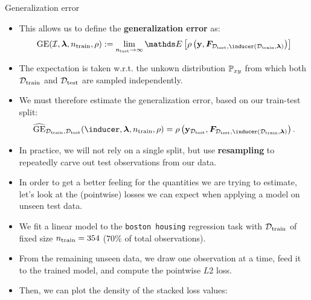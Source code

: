 \begin{vbframe}{Generalization error}

\begin{itemize}
  \item This allows us to define the \textbf{generalization error} as:
  $$\GEfull := 
  \lim_{\ntest \rightarrow \infty} \E \left[ \rho \left(
  \yv, \F_{\Dtest, \inducer(\D_{\mathrm{train}}, \lamv)} 
  \right)\right]$$
  \item The expectation is taken w.r.t. the unkown distribution $\mathbb{P}_{xy}$ from 
  which both $\mathcal{D}_{\text{train}}$ and $\mathcal{D}_{\text{test}}$ are sampled independently.
  \item We must therefore estimate the generalization error, based on our 
  train-test split:
  $$\GEh_{\Dtrain, \Dtest}(\inducer,
  \lamv, \ntrain, \rho) =
  \rho \left( \yv_{\Dtest}, \F_{\Dtest, 
  \inducer(\D_{\mathrm{train}}, \lamv)} \right).$$
  \item In practice, we will not rely on a single split, but use 
  \textbf{resampling} to repeatedly carve out test observations from our data.
\end{itemize}

\framebreak

\begin{itemize}
  \small
  \item In order to get a better feeling for the quantities we are trying to 
  estimate, let's look at the (pointwise) losses we can expect when applying 
  a model on unseen test data.
  \item We fit a linear model to the \texttt{boston housing} regression task 
  with $\mathcal{D}_{\text{train}}$ of fixed size $n_{\mathrm{train}} = 354$ (70\% of total observations).
  \item From the remaining unseen data, we draw one observation at a time, 
  feed it to the trained model, and compute the pointwise $L2$ loss.
  \item Then, we can plot the density of the stacked loss values:
\end{itemize}


\end{vbframe}
